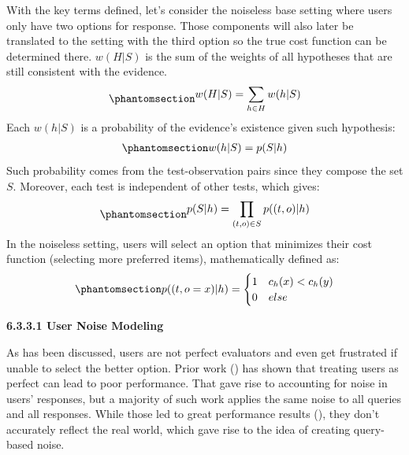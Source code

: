 \documentclass[
  letterpaper,
  numbers=noenddot,
  DIV=11]{scrreprt}
\theoremstyle{plain}
\theoremstyle{definition}
\theoremstyle{plain}
\theoremstyle{remark}
\begin{document}
With the key terms defined, let's consider the noiseless base setting
where users only have two options for response. Those components will
also later be translated to the setting with the third option so the
true cost function can be determined there. \(w(H|S)\) is the sum of the
weights of all hypotheses that are still consistent with the evidence.
\begin{equation}\phantomsection\label{eq-eq3.25}{\begin{aligned}
    w(H|S) = \sum_{h \in H} w(h | S)\\
\end{aligned}}\end{equation} Each \(w(h|S)\) is a probability of the
evidence's existence given such hypothesis:
\begin{equation}\phantomsection\label{eq-eq3.26}{\begin{aligned}
    w(h|S) = p(S|h)
\end{aligned}}\end{equation} Such probability comes from the
test-observation pairs since they compose the set \(S\). Moreover, each
test is independent of other tests, which gives:
\begin{equation}\phantomsection\label{eq-eq3.27}{\begin{aligned}
    p(S|h) = \prod_{(t,o) \in S} p((t,o) | h)
\end{aligned}}\end{equation} In the noiseless setting, users will select
an option that minimizes their cost function (selecting more preferred
items), mathematically defined as:
\begin{equation}\phantomsection\label{eq-prob_base}{\begin{aligned}
    p((t, o = x) | h) = 
    \begin{cases}
        1 & c_h(x) < c_h(y)\\
        0 & else
    \end{cases}
\end{aligned}}\end{equation}

\textbf{6.3.3.1 User Noise Modeling}

As has been discussed, users are not perfect evaluators and even get
frustrated if unable to select the better option. Prior work
() has shown that
treating users as perfect can lead to poor performance. That gave rise
to accounting for noise in users' responses, but a majority of such work
applies the same noise to all queries and all responses. While those led
to great performance results (), they don't accurately reflect the real world, which gave
rise to the idea of creating query-based noise.
\end{document}
